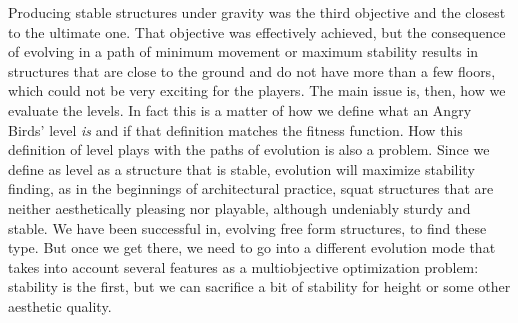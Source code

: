 \documentclass[sigconf]{acmart}
\begin{document}


Producing stable structures under gravity was the third objective and
the closest to the ultimate one. That objective was effectively
achieved, but the consequence of evolving in a path of minimum
movement or maximum stability results in structures that are close to
the ground and do not have more than a few floors, which could not be very 
exciting for the players. 
The main issue is, then, how we evaluate the levels. In fact this is 
a matter of how we define what an Angry Birds' level \textit{is} and if that 
definition matches the fitness function.
How this definition of level plays
with the paths of evolution is also a problem. Since we define as
level as a structure that is stable, evolution will maximize stability
finding, as in the beginnings of architectural practice, squat
structures that are neither aesthetically pleasing nor playable,
although undeniably sturdy and stable. We have been successful in,
evolving free form structures, to find these type. But once we get
there, we need to go into a different evolution mode that takes into
account several features as a multiobjective optimization problem:
stability is the first, but we can sacrifice a bit of stability for
height or some other aesthetic quality.
\end{document}
